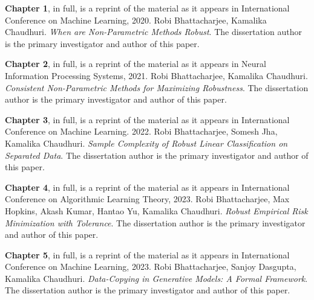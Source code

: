 \documentclass[12pt]{ucsddissertation}
\begin{document}
\begin{acknowledgements}
%
%

\pagebreak

\textbf{Chapter 1}, in full, is a reprint of the material as it appears in International Conference on Machine Learning, 2020. Robi Bhattacharjee, Kamalika Chaudhuri. \emph{When are Non-Parametric Methods Robust}. The dissertation author is the primary investigator and author of this paper. 

\textbf{Chapter 2}, in full, is a reprint of the material as it appears in Neural Information Processing Systems, 2021. Robi Bhattacharjee, Kamalika Chaudhuri. \emph{Consistent Non-Parametric Methods for Maximizing Robustness}. The dissertation author is the primary investigator and author of this paper. 

\textbf{Chapter 3}, in full, is a reprint of the material as it appears in International Conference on Machine Learning. 2022. Robi Bhattacharjee,  Somesh Jha, Kamalika Chaudhuri. \emph{Sample Complexity of Robust Linear Classification on Separated Data}. The dissertation author is the primary investigator and author of this paper.

\textbf{Chapter 4}, in full, is a reprint of the material as it appears in International Conference on Algorithmic Learning Theory, 2023. Robi Bhattacharjee, Max Hopkins, Akash Kumar, Hantao Yu, Kamalika Chaudhuri. \emph{Robust Empirical Risk Minimization with Tolerance}. The dissertation author is the primary investigator and author of this paper.

\textbf{Chapter 5}, in full, is a reprint of the material as it appears in International Conference on Machine Learning, 2023. Robi Bhattacharjee, Sanjoy Dasgupta, Kamalika Chaudhuri. \emph{Data-Copying in Generative Models: A Formal Framework}. The dissertation author is the primary investigator and author of this paper. 
\end{acknowledgements}
\end{document}
